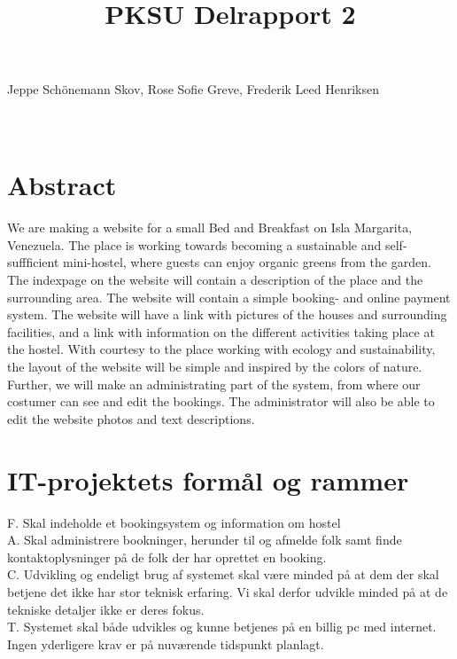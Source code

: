 \documentclass[12pt,a4paper]{article}
\begin{document}
\title{PKSU Delrapport 2}
\maketitle
\begin{center}
Jeppe Schönemann Skov, Rose Sofie Greve, Frederik Leed Henriksen \\ \hfill \\ \hfill \\ 
\end{center}
\newpage
\tableofcontents
\newpage
\section{Abstract}
We are making a website for a small Bed and Breakfast on Isla Margarita, Venezuela. The place is working towards becoming a sustainable and self-suffficient mini-hostel, where guests can enjoy organic greens from the garden.
The indexpage on the website will contain a description of the place and the surrounding area.
The website will contain a simple booking- and online payment system.
The website will have a link with pictures of the houses and surrounding facilities, and a link with information on the different activities taking place at the hostel.
With courtesy to the place working with ecology and sustainability, the layout of the website will be simple and inspired by the colors of nature.
Further, we will make an administrating part of the system, from where our costumer can see and edit the bookings. The administrator will also be able to edit the website photos and text descriptions. 
\newpage
\section{IT-projektets formål og rammer}
F. Skal indeholde et bookingsystem og information om hostel \\

A. Skal administrere bookninger, herunder til og afmelde folk samt finde kontaktoplysninger på de folk der har oprettet en booking.\\
 
C. Udvikling og endeligt brug af systemet skal være minded på at dem der skal betjene det ikke har stor teknisk erfaring. Vi skal derfor udvikle minded på at de tekniske detaljer ikke er deres fokus.\\

T. Systemet skal både udvikles og kunne betjenes på en billig pc med internet. Ingen yderligere krav er på nuværende tidspunkt planlagt. \\
\end{document}
